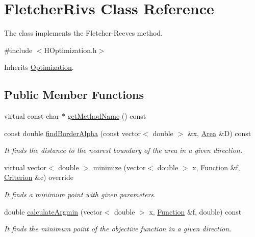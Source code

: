 \hypertarget{class_fletcher_rivs}{}\section{Fletcher\+Rivs Class Reference}
\label{class_fletcher_rivs}


The class implements the Fletcher-\/\+Reeves method.  




{\ttfamily \#include $<$H\+Optimization.\+h$>$}



Inherits \hyperlink{class_optimization}{Optimization}.

\subsection*{Public Member Functions}
\begin{DoxyCompactItemize}
\item 
virtual const char $\ast$ \hyperlink{class_fletcher_rivs_af73e7eb858fdfb37d30b97bfb38ef01e}{get\+Method\+Name} () const
\item 
const double \hyperlink{class_fletcher_rivs_a3b6985d8c91723246da50f0a27809783}{find\+Border\+Alpha} (const vector$<$ double $>$ \&x, \hyperlink{class_area}{Area} \&D) const
\begin{DoxyCompactList}\small\item\em It finds the distance to the nearest boundary of the area in a given direction. \end{DoxyCompactList}\item 
virtual vector$<$ double $>$ \hyperlink{class_fletcher_rivs_a2bf6706dae306522d3c748503385d98e}{minimize} (vector$<$ double $>$ x, \hyperlink{class_function}{Function} \&f, \hyperlink{class_criterion}{Criterion} \&c) override
\begin{DoxyCompactList}\small\item\em It finds a minimum point with given parameters. \end{DoxyCompactList}\item 
double \hyperlink{class_fletcher_rivs_ac6d826548f2c04abceb6de9b56aeb3e0}{calculate\+Argmin} (vector$<$ double $>$ x, \hyperlink{class_function}{Function} \&f, double) const
\begin{DoxyCompactList}\small\item\em It finds the minimum point of the objective function in a given direction. \end{DoxyCompactList}\end{DoxyCompactItemize}


